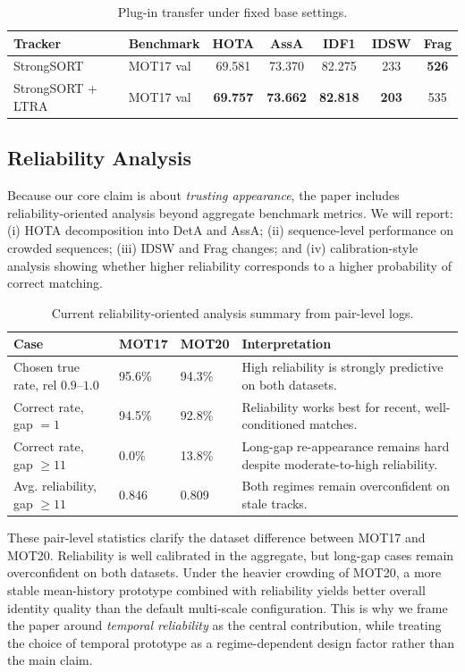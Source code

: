 \begin{table}[t]
\centering
\caption{Plug-in transfer under fixed base settings.}
\label{tab:transfer}
\begin{tabular}{llccccc}
\toprule
Tracker & Benchmark & HOTA & AssA & IDF1 & IDSW & Frag \\
\midrule
StrongSORT & MOT17 val & 69.581 & 73.370 & 82.275 & 233 & \textbf{526} \\
StrongSORT + LTRA & MOT17 val & \textbf{69.757} & \textbf{73.662} & \textbf{82.818} & \textbf{203} & 535 \\
\bottomrule
\end{tabular}
\end{table}

\subsection{Reliability Analysis}
Because our core claim is about \emph{trusting appearance}, the paper includes reliability-oriented analysis beyond aggregate benchmark metrics. We will report: (i) HOTA decomposition into DetA and AssA; (ii) sequence-level performance on crowded sequences; (iii) IDSW and Frag changes; and (iv) calibration-style analysis showing whether higher reliability corresponds to a higher probability of correct matching.

\begin{table}[t]
\centering
\caption{Current reliability-oriented analysis summary from pair-level logs.}
\label{tab:reliability}
\begin{tabular}{lp{1.3cm}p{1.3cm}p{6.2cm}}
\toprule
Case & MOT17 & MOT20 & Interpretation \\
\midrule
Chosen true rate, rel $0.9$--$1.0$ & 95.6\% & 94.3\% & High reliability is strongly predictive on both datasets. \\
Correct rate, gap $=1$ & 94.5\% & 92.8\% & Reliability works best for recent, well-conditioned matches. \\
Correct rate, gap $\ge 11$ & 0.0\% & 13.8\% & Long-gap re-appearance remains hard despite moderate-to-high reliability. \\
Avg. reliability, gap $\ge 11$ & 0.846 & 0.809 & Both regimes remain overconfident on stale tracks. \\
\bottomrule
\end{tabular}
\end{table}

These pair-level statistics clarify the dataset difference between MOT17 and MOT20. Reliability is well calibrated in the aggregate, but long-gap cases remain overconfident on both datasets. Under the heavier crowding of MOT20, a more stable mean-history prototype combined with reliability yields better overall identity quality than the default multi-scale configuration. This is why we frame the paper around \emph{temporal reliability} as the central contribution, while treating the choice of temporal prototype as a regime-dependent design factor rather than the main claim.

